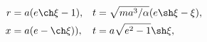 \begin{align}
	r &= a(e\ch\xi-1), & t&=\sqrt{ma^3/\alpha}(e\sh\xi-\xi), \\
	x &= a(e-\ch\xi)), & t&=a\sqrt{e^2-1}\sh\xi,
\end{align}
